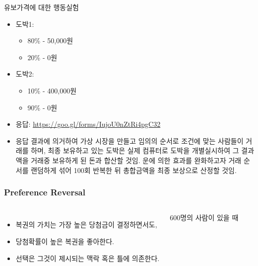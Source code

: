 \documentclass[final]{beamer}
\begin{document}
\begin{frame}[t]{유보가격에 대한 행동실험}
	\begin{itemize}
		\item 도박1: 
		\begin{itemize}
			\item 80\% - 50,000원
			\item 20\% - 0원
		\end{itemize}
		\item 도박2:
		\begin{itemize}
			\item 10\% - 400,000원
			\item 90\% - 0원
		\end{itemize}
		\item 응답: \url{https://goo.gl/forms/IujoU0nZtRi4pgC32}
		\item ​응답 결과에 의거하여 가상 시장을 만들고 임의의 순서로 조건에 맞는 사람들이 거래를 하며, 최종 보유하고 있는 도박은 실제 컴퓨터로 도박을 개별실시하여 그 결과액을 거래중 보유하게 된 돈과 합산할 것임. 운에 의한 효과를 완화하고자 거래 순서를 랜덤하게 섞어 100회 반복한 뒤 총합금액을 최종 보상으로 산정할 것임. 
	\end{itemize}
\end{frame}

%
\begin{frame}\frametitle{Preference Reversal}\vspace{3em}
%
\begin{columns}[c]
\column{12em}
\begin{itemize}
\item 복권의 가치는 가장 높은 당첨금이 결정하면서도, 
\item 당첨확률이 높은 복권을 좋아한다. 
\item 선택은 그것이 제시되는 맥락 혹은 틀에 의존한다. 
\end{itemize}
\column{18em}
600명의 사람이 있을 때 \\[1em]
\\[1em]
\end{columns}
\end{frame}
%
\end{document}
